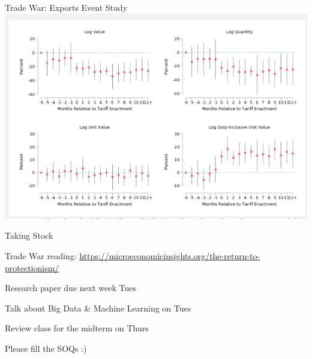 \documentclass{./../div_teaching_slides}
\begin{document}
\begin{frame}{Trade War: Exports Event Study}
\centering
\includegraphics[scale=0.4]{eg2_1.png}
\end{frame}




\begin{frame}{Taking Stock}
\begin{witemize}
 \item Trade War reading: \href{https://microeconomicinsights.org/the-return-to-protectionism/}{https://microeconomicinsights.org/the-return-to-protectionism/}
  \item Research paper due next week Tues 
  \item Talk about Big Data \& Machine Learning on Tues
  \item Review class for the midterm on Thurs
  \item Please fill the SOQs :)
\end{witemize}

\end{frame}
\end{document}
